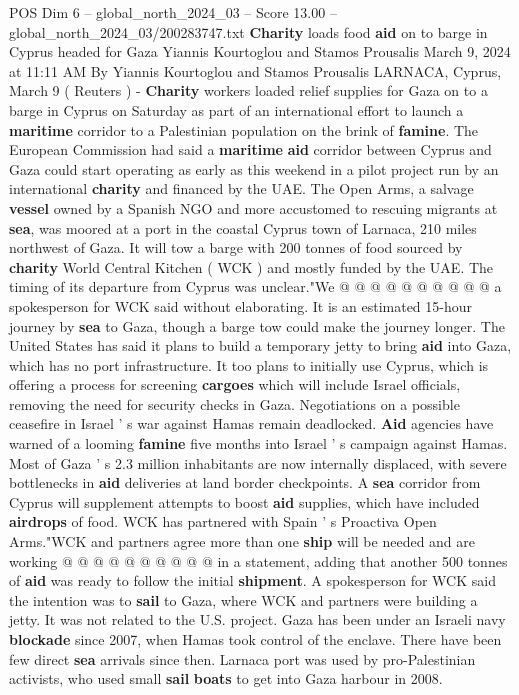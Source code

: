 \begin{textsample}{POS Dim 6 – global\_north\_2024\_03 – Score 13.00 – global\_north\_2024\_03/200283747.txt}  \label{ex:f6_pos_048}
\textbf{Charity} loads food \textbf{aid} on to barge in Cyprus headed for Gaza Yiannis Kourtoglou and Stamos Prousalis March 9, 2024 at 11:11 AM By Yiannis Kourtoglou and Stamos Prousalis LARNACA, Cyprus, March 9 ( Reuters ) - \textbf{Charity} workers loaded relief supplies for Gaza on to a barge in Cyprus on Saturday as part of an international effort to launch a \textbf{maritime} corridor to a Palestinian population on the brink of \textbf{famine}.
The European Commission had said a \textbf{maritime} \textbf{aid} corridor between Cyprus and Gaza could start operating as early as this weekend in a pilot project run by an international \textbf{charity} and financed by the UAE.
The Open Arms, a salvage \textbf{vessel} owned by a Spanish NGO and more accustomed to rescuing migrants at \textbf{sea}, was moored at a port in the coastal Cyprus town of Larnaca, 210 miles northwest of Gaza.
It will tow a barge with 200 tonnes of food sourced by \textbf{charity} World Central Kitchen ( WCK ) and mostly funded by the UAE.
The timing of its departure from Cyprus was unclear."We @ @ @ @ @ @ @ @ @ @ a spokesperson for WCK said without elaborating.
It is an estimated 15-hour journey by \textbf{sea} to Gaza, though a barge tow could make the journey longer.
The United States has said it plans to build a temporary jetty to bring \textbf{aid} into Gaza, which has no port infrastructure.
It too plans to initially use Cyprus, which is offering a process for screening \textbf{cargoes} which will include Israel officials, removing the need for security checks in Gaza.
Negotiations on a possible ceasefire in Israel ' s war against Hamas remain deadlocked. \textbf{Aid} agencies have warned of a looming \textbf{famine} five months into Israel ' s campaign against Hamas.
Most of Gaza ' s 2.3 million inhabitants are now internally displaced, with severe bottlenecks in \textbf{aid} deliveries at land border checkpoints.
A \textbf{sea} corridor from Cyprus will supplement attempts to boost \textbf{aid} supplies, which have included \textbf{airdrops} of food.
WCK has partnered with Spain ' s Proactiva Open Arms."WCK and partners agree more than one \textbf{ship} will be needed and are working @ @ @ @ @ @ @ @ @ @ in a statement, adding that another 500 tonnes of \textbf{aid} was ready to follow the initial \textbf{shipment}.
A spokesperson for WCK said the intention was to \textbf{sail} to Gaza, where WCK and partners were building a jetty.
It was not related to the U.S. project.
Gaza has been under an Israeli navy \textbf{blockade} since 2007, when Hamas took control of the enclave.
There have been few direct \textbf{sea} arrivals since then.
Larnaca port was used by pro-Palestinian activists, who used small \textbf{sail} \textbf{boats} to get into Gaza harbour in 2008.

\end{textsample}
